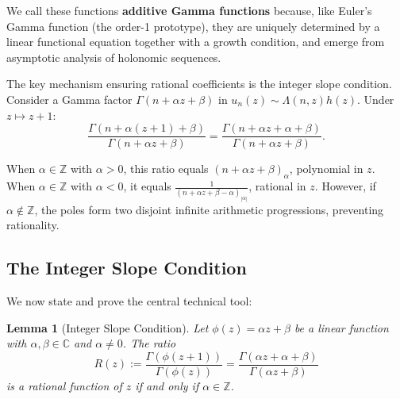 \documentclass[11pt,reqno]{amsart}
\newtheorem{lemma}[theorem]{Lemma}
\theoremstyle{definition}
\newcommand{\Z}{\mathbb{Z}}
\newcommand{\C}{\mathbb{C}}
\numberwithin{equation}{section}
\begin{document}
We call these functions \textbf{additive Gamma functions} because, like Euler's Gamma function (the order-1 prototype), they are uniquely determined by a linear functional equation together with a growth condition, and emerge from asymptotic analysis of holonomic sequences.

The key mechanism ensuring rational coefficients is the integer slope condition. Consider a Gamma factor $\Gamma(n+\alpha z+\beta)$ in $u_n(z) \sim \Lambda(n,z)h(z)$. Under $z\mapsto z+1$:
$$\frac{\Gamma(n+\alpha(z+1)+\beta)}{\Gamma(n+\alpha z+\beta)} = \frac{\Gamma(n+\alpha z + \alpha + \beta)}{\Gamma(n+\alpha z+\beta)}.$$

When $\alpha \in \Z$ with $\alpha > 0$, this ratio equals $(n+\alpha z+\beta)_\alpha$, polynomial in $z$. When $\alpha \in \Z$ with $\alpha < 0$, it equals $\frac{1}{(n+\alpha z+\beta-\alpha)_{|\alpha|}}$, rational in $z$. However, if $\alpha\notin\Z$, the poles form two disjoint infinite arithmetic progressions, preventing rationality.

\subsection{The Integer Slope Condition}

We now state and prove the central technical tool:

\begin{lemma}[Integer Slope Condition]\label{lem:integer-slope}
Let $\phi(z) = \alpha z + \beta$ be a linear function with $\alpha, \beta \in \C$ and $\alpha \neq 0$. The ratio
$$R(z) := \frac{\Gamma(\phi(z+1))}{\Gamma(\phi(z))} = \frac{\Gamma(\alpha z + \alpha + \beta)}{\Gamma(\alpha z + \beta)}$$
is a rational function of $z$ if and only if $\alpha \in \Z$.
\end{lemma}
\end{document}
